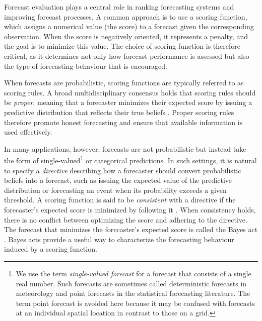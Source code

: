 \documentclass[10pt]{article} %
\theoremstyle{theorem}
\theoremstyle{definition}
\begin{document}
Forecast evaluation plays a central role in ranking forecasting systems and improving forecast processes. A common approach is to use a scoring function, which assigns a numerical value (the score) to a forecast given the corresponding observation. When the score is negatively oriented, it represents a penalty, and the goal is to minimize this value. The choice of scoring function is therefore critical, as it determines not only how forecast performance is assessed but also the type of forecasting behaviour that is encouraged.

When forecasts are probabilistic, scoring functions are typically referred to as scoring rules. A broad multidisciplinary consensus holds that scoring rules should be \textit{proper}, meaning that a forecaster minimizes their expected score by issuing a predictive distribution that reflects their true beliefs \citep{murphy1967note, gneiting2007strictly}. Proper scoring rules therefore promote honest forecasting and ensure that available information is used effectively.

In many applications, however, forecasts are not probabilistic but instead take the form of single-valued\footnote{We use the term \textit{single-valued forecast} for a forecast that consists of a single real number. Such forecasts are sometimes called deterministic forecasts in meteorology and point forecasts in the statistical forecasting literature. The term point forecast is avoided here because it may be confused with forecasts at an individual spatial location in contrast to those on a grid.} or categorical predictions. In such settings, it is natural to specify a \textit{directive} describing how a forecaster should convert probabilistic beliefs into a forecast, such as issuing the expected value of the predictive distribution or forecasting an event when its probability exceeds a given threshold. A scoring function is said to be \textit{consistent} with a directive if the forecaster's expected score is minimized by following it \citep{murphy1985forecast, gneiting2011making}. When consistency holds, there is no conflict between optimizing the score and adhering to the directive. The forecast that minimizes the forecaster's expected score is called the Bayes act \citep{gneiting2011making}. Bayes acts provide a useful way to characterize the forecasting behaviour induced by a scoring function.
\end{document}
